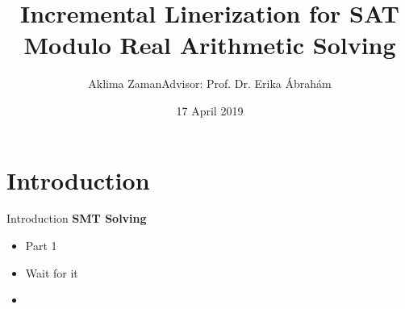 \documentclass[]{beamer}
\begin{document}
\RWTHtoc

\title[Incremental Linerization for SAT Modulo Real Arithmetic Solving]{Incremental Linerization for SAT Modulo Real Arithmetic Solving}

\author[Aklima Zaman]{\textcolor{RWTHblue}{Aklima Zaman}\linebreak Advisor: Prof. Dr. Erika Ábrahám}

\institute[]{}

\date{17 April 2019}


\frame{
	\titlepage	
}

\section{Introduction}
\begin{frame}{Introduction}
    \textbf{SMT Solving}
    \begin{itemize}
        \pause
        \item Part 1
        \pause
		\item Wait for it
		\item 
    \end{itemize}
\end{frame}
\end{document}
